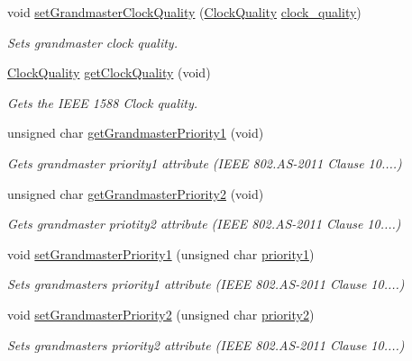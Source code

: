 \begin{DoxyCompactItemize}
void \hyperlink{class_i_e_e_e1588_clock_af4c442ddfce5aaa4314821a118519e0a}{set\+Grandmaster\+Clock\+Quality} (\hyperlink{struct_clock_quality}{Clock\+Quality} \hyperlink{class_i_e_e_e1588_clock_aca3c1cfd540c15574df0890efc980cbe}{clock\+\_\+quality})
\begin{DoxyCompactList}\small\item\em Sets grandmaster clock quality. \end{DoxyCompactList}\item 
\hyperlink{struct_clock_quality}{Clock\+Quality} \hyperlink{class_i_e_e_e1588_clock_abb0ea8615a45a32ebc4e7ca52c0d3bf1}{get\+Clock\+Quality} (void)
\begin{DoxyCompactList}\small\item\em Gets the I\+E\+EE 1588 Clock quality. \end{DoxyCompactList}\item 
unsigned char \hyperlink{class_i_e_e_e1588_clock_a78151d3c07bb5d72555b8aec6d765f88}{get\+Grandmaster\+Priority1} (void)
\begin{DoxyCompactList}\small\item\em Gets grandmaster priority1 attribute (I\+E\+EE 802.\+AS-\/2011 Clause 10....) \end{DoxyCompactList}\item 
unsigned char \hyperlink{class_i_e_e_e1588_clock_a7bd53c122e2026948da666611d2529b9}{get\+Grandmaster\+Priority2} (void)
\begin{DoxyCompactList}\small\item\em Gets grandmaster priotity2 attribute (I\+E\+EE 802.\+AS-\/2011 Clause 10....) \end{DoxyCompactList}\item 
void \hyperlink{class_i_e_e_e1588_clock_a6d12713c65a9d60198a3d3bc27a77929}{set\+Grandmaster\+Priority1} (unsigned char \hyperlink{class_i_e_e_e1588_clock_aaaa084057ac150d5cfeaff1ccee422b8}{priority1})
\begin{DoxyCompactList}\small\item\em Sets grandmaster\textquotesingle{}s priority1 attribute (I\+E\+EE 802.\+AS-\/2011 Clause 10....) \end{DoxyCompactList}\item 
void \hyperlink{class_i_e_e_e1588_clock_a74ab55d43941f7d4284d78c81e3cf8b3}{set\+Grandmaster\+Priority2} (unsigned char \hyperlink{class_i_e_e_e1588_clock_a726134dcd45a308e0e84419c09793ed3}{priority2})
\begin{DoxyCompactList}\small\item\em Sets grandmaster\textquotesingle{}s priority2 attribute (I\+E\+EE 802.\+AS-\/2011 Clause 10....) \end{DoxyCompactList}\item 

\end{DoxyCompactItemize}
